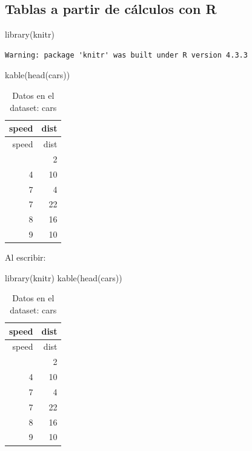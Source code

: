 \documentclass[
  letterpaper,
  DIV=11,
  numbers=noendperiod]{scrartcl}
\newenvironment{Shaded}{\begin{snugshade}}{\end{snugshade}}
\newcommand{\FunctionTok}[1]{\textcolor[rgb]{0.28,0.35,0.67}{#1}}
\newcommand{\NormalTok}[1]{\textcolor[rgb]{0.00,0.23,0.31}{#1}}
\begin{document}
\newpage{}

\subsection{Tablas a partir de cálculos con
R}\label{tablas-a-partir-de-cuxe1lculos-con-r}

\begin{Shaded}
\begin{Highlighting}[]
\FunctionTok{library}\NormalTok{(knitr)}
\end{Highlighting}
\end{Shaded}

\begin{verbatim}
Warning: package 'knitr' was built under R version 4.3.3
\end{verbatim}

\begin{Shaded}
\begin{Highlighting}[]
\FunctionTok{kable}\NormalTok{(}\FunctionTok{head}\NormalTok{(cars))}
\end{Highlighting}
\end{Shaded}

\begin{longtable}[]{@{}rr@{}}
\caption{Datos en el dataset: cars}\tabularnewline
\toprule\noalign{}
speed & dist \\
\midrule\noalign{}
\endfirsthead
\toprule\noalign{}
speed & dist \\
\midrule\noalign{}
\endhead
\bottomrule\noalign{}
\endlastfoot
4 & 2 \\
4 & 10 \\
7 & 4 \\
7 & 22 \\
8 & 16 \\
9 & 10 \\
\end{longtable}

Al escribir:

\begin{Shaded}
\begin{Highlighting}[]
\FunctionTok{library}\NormalTok{(knitr)}
\FunctionTok{kable}\NormalTok{(}\FunctionTok{head}\NormalTok{(cars))}
\end{Highlighting}
\end{Shaded}

\begin{longtable}[]{@{}rr@{}}
\caption{Datos en el dataset: cars}\tabularnewline
\toprule\noalign{}
speed & dist \\
\midrule\noalign{}
\endfirsthead
\toprule\noalign{}
speed & dist \\
\midrule\noalign{}
\endhead
\bottomrule\noalign{}
\endlastfoot
4 & 2 \\
4 & 10 \\
7 & 4 \\
7 & 22 \\
8 & 16 \\
9 & 10 \\
\end{longtable}
\end{document}
